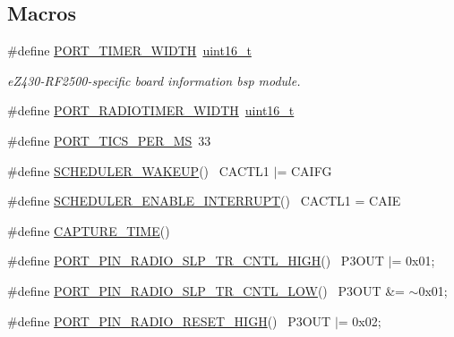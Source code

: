 \subsection*{Macros}
\begin{DoxyCompactItemize}
\item 
\#define \hyperlink{ez430-rf2500_2board__info_8h_abe66b9c1c60db84f2a99f2b827275f24}{P\+O\+R\+T\+\_\+\+T\+I\+M\+E\+R\+\_\+\+W\+I\+D\+TH}~\hyperlink{_p_e___types_8h_a1f1825b69244eb3ad2c7165ddc99c956}{uint16\+\_\+t}
\begin{DoxyCompactList}\small\item\em e\+Z430-\/\+R\+F2500-\/specific board information bsp module. \end{DoxyCompactList}\item 
\#define \hyperlink{ez430-rf2500_2board__info_8h_ac16e02aadd749b2d27638bed1a805a59}{P\+O\+R\+T\+\_\+\+R\+A\+D\+I\+O\+T\+I\+M\+E\+R\+\_\+\+W\+I\+D\+TH}~\hyperlink{_p_e___types_8h_a1f1825b69244eb3ad2c7165ddc99c956}{uint16\+\_\+t}
\item 
\#define \hyperlink{ez430-rf2500_2board__info_8h_a71ac4f01b5932487c50c4f1a4b821a92}{P\+O\+R\+T\+\_\+\+T\+I\+C\+S\+\_\+\+P\+E\+R\+\_\+\+MS}~33
\item 
\#define \hyperlink{ez430-rf2500_2board__info_8h_a279c683842015c43581411bfa8362081}{S\+C\+H\+E\+D\+U\+L\+E\+R\+\_\+\+W\+A\+K\+E\+UP}()                                ~C\+A\+C\+T\+L1 $\vert$= C\+A\+I\+FG
\item 
\#define \hyperlink{ez430-rf2500_2board__info_8h_a629721de419fa273ad4a7d63e38060a1}{S\+C\+H\+E\+D\+U\+L\+E\+R\+\_\+\+E\+N\+A\+B\+L\+E\+\_\+\+I\+N\+T\+E\+R\+R\+U\+PT}()            ~C\+A\+C\+T\+L1  = C\+A\+IE
\item 
\#define \hyperlink{ez430-rf2500_2board__info_8h_a5083015b737a8da9386ae7544e239ebb}{C\+A\+P\+T\+U\+R\+E\+\_\+\+T\+I\+ME}()
\item 
\#define \hyperlink{ez430-rf2500_2board__info_8h_a3392fe43c45e3fe7647d5a265ef814dd}{P\+O\+R\+T\+\_\+\+P\+I\+N\+\_\+\+R\+A\+D\+I\+O\+\_\+\+S\+L\+P\+\_\+\+T\+R\+\_\+\+C\+N\+T\+L\+\_\+\+H\+I\+GH}()  ~P3\+O\+UT $\vert$=  0x01;
\item 
\#define \hyperlink{ez430-rf2500_2board__info_8h_a803d6622fedb3c29906d1f2232bd69c1}{P\+O\+R\+T\+\_\+\+P\+I\+N\+\_\+\+R\+A\+D\+I\+O\+\_\+\+S\+L\+P\+\_\+\+T\+R\+\_\+\+C\+N\+T\+L\+\_\+\+L\+OW}()    ~P3\+O\+UT \&= $\sim$0x01;
\item 
\#define \hyperlink{ez430-rf2500_2board__info_8h_aa9d96d7a8219fd2ad5e61e577807b781}{P\+O\+R\+T\+\_\+\+P\+I\+N\+\_\+\+R\+A\+D\+I\+O\+\_\+\+R\+E\+S\+E\+T\+\_\+\+H\+I\+GH}()    ~P3\+O\+UT $\vert$=  0x02;

\end{DoxyCompactItemize}
